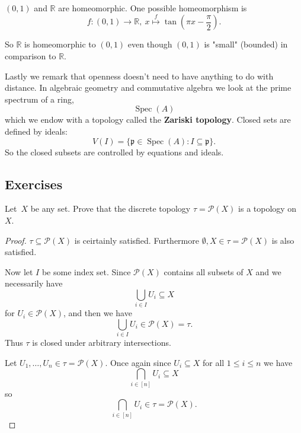 \begin{ex}
    $(0,1)$ and $\mathbb R$ are homeomorphic. 
    One possible homeomorphism is 
    \[
        f : (0,1) \to \mathbb R, \ 
        x \overset{f}{\mapsto} \tan\left(\pi x - \frac{\pi}{2}\right).
    \]
\end{ex}
So $\mathbb R$ is homeomorphic to $(0,1)$ even though $(0,1)$ is 
"small" (bounded) in comparison to $\mathbb R$.

Lastly we remark that openness doesn't need to have 
anything to do with distance. 
In algebraic geometry and commutative algebra we look at 
the prime spectrum of a ring, 
\[
    \operatorname{Spec}(A)
\]
which we endow with a topology called the \textbf{Zariski topology}. 
Closed sets are defined by ideals: 
\[
    V(I) = \{\mathfrak p \in \operatorname{Spec}(A) : 
    I \subseteq \mathfrak p\}. 
\]
So the closed subsets are controlled by equations and ideals. 

\subsection*{Exercises}

\begin{prob}
    Let $X$ be any set. Prove that 
    the discrete topology $\tau = \mathcal P(X)$ is 
    a topology on $X$. 
\end{prob}
\begin{proof}
    $\tau \subseteq \mathcal P(X)$ is ceirtainly satisfied. 
    Furthermore $\emptyset, X \in \tau = \mathcal P(X)$ is 
    also satisfied. 

    Now let $I$ be some index set. Since 
    $\mathcal P(X)$ contains all subsets of $X$ and we 
    necessarily have 
    \[
        \bigcup_{i \in I} U_i \subseteq X
    \]
    for $U_i \in \mathcal P(X)$, and then 
    we have 
    \[
        \bigcup_{i\in I} U_i \in \mathcal P(X) = \tau. 
    \]
    Thus $\tau$ is closed under arbitrary intersections. 

    Let $U_1,\ldots,U_n \in \tau = \mathcal P(X)$. 
    Once again since $U_i \subseteq X$ for all $1 \leq i \leq n$ we 
    have 
    \[
        \bigcap_{i\in[n]} U_i \subseteq X
    \]
    so 
    \[
        \bigcap_{i\in[n]} U_i \in \tau = \mathcal P(X).
    \]
\end{proof}

